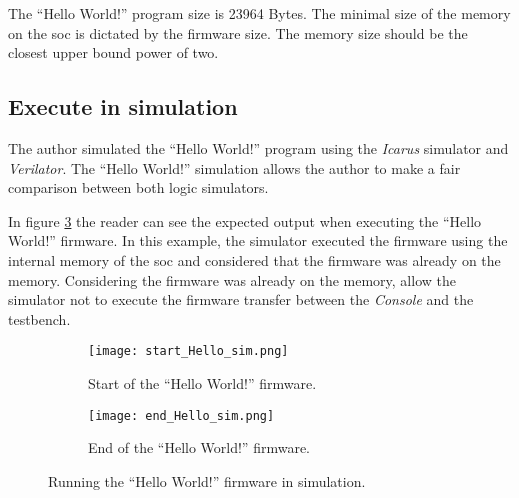 The \enquote{Hello World!} program size is 23964 Bytes. The minimal size of the memory on the \acrshort{soc} is dictated by the firmware size. The memory size should be the closest upper bound power of two.

\subsection{Execute in simulation}
The author simulated the \enquote{Hello World!} program using the \textit{Icarus} simulator and \textit{Verilator}. The \enquote{Hello World!} simulation allows the author to make a fair comparison between both logic simulators.

In figure \ref{fig:hello_sim} the reader can see the expected output when executing the \enquote{Hello World!} firmware. In this example, the simulator executed the firmware using the internal memory of the \acrshort{soc} and considered that the firmware was already on the memory. Considering the firmware was already on the memory, allow the simulator not to execute the firmware transfer between the \textit{Console} and the testbench.

\begin{figure}[!ht]
    \centering
    \begin{subfigure}[b]{0.49\textwidth}
        \centering
        \texttt{[image: start\_Hello\_sim.png]}
        \caption{Start of the \enquote{Hello World!} firmware.}
        \label{fig:start_hello_sim}
    \end{subfigure}
    \hfill
    \begin{subfigure}[b]{0.49\textwidth}
        \centering
        \texttt{[image: end\_Hello\_sim.png]}
        \caption{End of the \enquote{Hello World!} firmware.}
        \label{fig:end_hello_sim}
    \end{subfigure}
    \caption{Running the \enquote{Hello World!} firmware in simulation.}
    \label{fig:hello_sim}
\end{figure}

